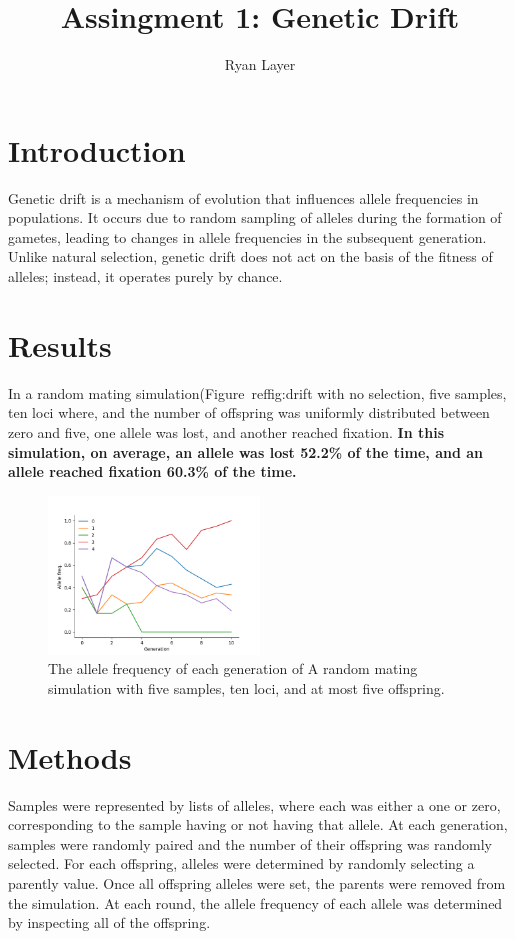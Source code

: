 \documentclass[11pt, letterpaper]{article}
\begin{document}
\title{Assingment 1: Genetic Drift}
\author{Ryan Layer}
\maketitle

\section{Introduction}
Genetic drift is a mechanism of evolution that influences allele frequencies in
populations. It occurs due to random sampling of alleles during the formation
of gametes, leading to changes in allele frequencies in the subsequent
generation. Unlike natural selection, genetic drift does not act on the basis
of the fitness of alleles; instead, it operates purely by chance.

\section{Results}
In a random mating simulation(Figure~ref{fig:drift} with no selection, five
samples, ten loci where, and the number of offspring was uniformly distributed
between zero and five, one allele was lost, and another reached fixation. {\bf In
this simulation, on average, an allele was lost 52.2\% of the time, and an
allele reached fixation 60.3\% of the time.}

\begin{figure}[h]
    \centering
    \includegraphics[width=0.5\textwidth]{fig1}
    \caption{The allele frequency of each generation of A random mating
    simulation with five samples, ten loci, and at most five offspring.}
    \label{fig:drift}
\end{figure}

\section{Methods}


Samples were represented by lists of alleles, where each was either a one or
zero, corresponding to the sample having or not having that allele. At each
generation, samples were randomly paired and the number of their offspring was
randomly selected. For each offspring, alleles were determined by randomly
selecting a parently value. Once all offspring alleles were set, the parents
were removed from the simulation. At each round, the allele frequency of each
allele was determined by inspecting all of the offspring.
\end{document}
